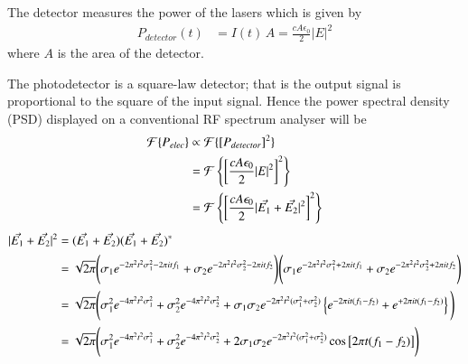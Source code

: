 
The detector measures the power of the lasers which is given by
\begin{align}
P_{detector}(t) &= I(t) \, A = \frac{cA\epsilon_0}{2}|E|^2
\end{align}
where $A$ is the area of the detector.

The photodetector is a square-law detector; that is the output signal is proportional to the square of the input signal.
Hence the power spectral density (PSD) displayed on a conventional RF spectrum analyser will be
\begin{align}
\mathcal{F}\{P_{elec}\} &\propto \mathcal{F}\{\left[P_{detector}\right]^2\}\notag\\
&= \mathcal{F}\left\{\left[\frac{cA\epsilon_0}{2}|E|^2\right]^2\right\}\notag\\
&= \mathcal{F}\left\{\left[\frac{cA\epsilon_0}{2}|\vec{E_1}+\vec{E_2}|^2\right]^2\right\}
\end{align}
\begin{align}
|\vec{E_1}+\vec{E_2}|^2 &= (\vec{E_1}+\vec{E_2})(\vec{E_1}+\vec{E_2})^*\notag\\
&= \sqrt{2\pi} \Bigg(\sigma_1 e^{-2\pi^2t^2\sigma_1^2-2\pi i t f_1} + \sigma_2 e^{-2\pi^2t^2\sigma_2^2-2\pi i t f_2}\Bigg)\Bigg(\sigma_1 e^{-2\pi^2t^2\sigma_1^2+2\pi i t f_1} + \sigma_2 e^{-2\pi^2t^2\sigma_2^2+2\pi i t f_2}\Bigg)\notag\\
&= \sqrt{2\pi}\Bigg(\sigma_1^2 e^{-4\pi^2t^2\sigma_1^2} + \sigma_2^2 e^{-4\pi^2t^2\sigma_2^2} + \sigma_1\sigma_2 e^{-2\pi^2t^2(\sigma_1^2+\sigma_2^2)}\left\{e^{-2\pi i t (f_1-f_2)} + e^{+2\pi i t (f_1-f_2)} \right\}\Bigg)\notag\\
&= \sqrt{2\pi}\Bigg(\sigma_1^2 e^{-4\pi^2t^2\sigma_1^2} + \sigma_2^2 e^{-4\pi^2t^2\sigma_2^2} + 2\sigma_1\sigma_2 e^{-2\pi^2t^2(\sigma_1^2+\sigma_2^2)}\cos\big[2\pi t (f_1-f_2)\big] \Bigg)
\end{align}
